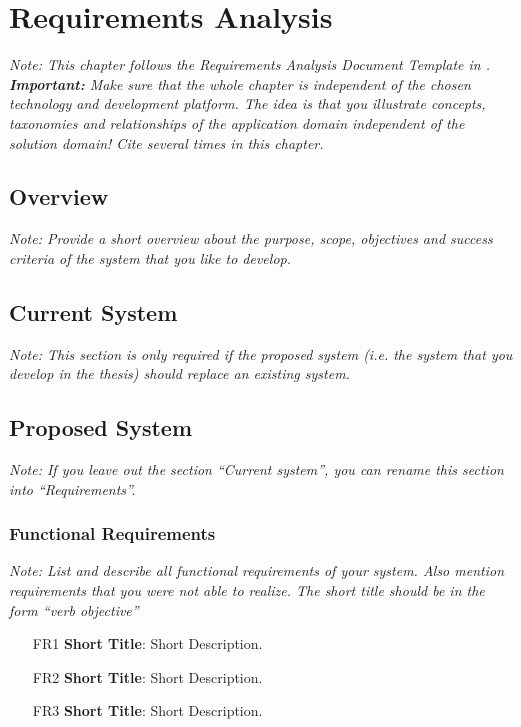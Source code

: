 \documentclass[a4paper,12pt,twoside]{report}
\begin{document}

\chapter{Requirements Analysis}

\textit{Note: This chapter follows the Requirements Analysis Document Template in \cite{bruegge2004object}. 
\textbf{Important:} Make sure that the whole chapter is independent of the chosen technology and development platform. The idea is that you illustrate concepts, taxonomies and relationships of the application domain independent of the solution domain!
Cite \cite{bruegge2004object} several times in this chapter.}

\section{Overview}

\textit{Note: Provide a short overview about the purpose, scope, objectives and success criteria of the system that you like to develop.}

\section{Current System}

\textit{Note: This section is only required if the proposed system (i.e. the system that you develop in the thesis) should replace an existing system.}

\section{Proposed System}

\textit{Note: If you leave out the section ``Current system'', you can rename this section into ``Requirements''.}

\subsection{Functional Requirements}

\textit{Note: List and describe all functional requirements of your system. Also mention requirements that you were not able to realize. The short title should be in the form ``verb objective''}

\begin{itemize}
\item [FR1] \textbf{Short Title}: Short Description.
\item [FR2] \textbf{Short Title}: Short Description.
\item [FR3] \textbf{Short Title}: Short Description.
\end{itemize}
\end{document}
